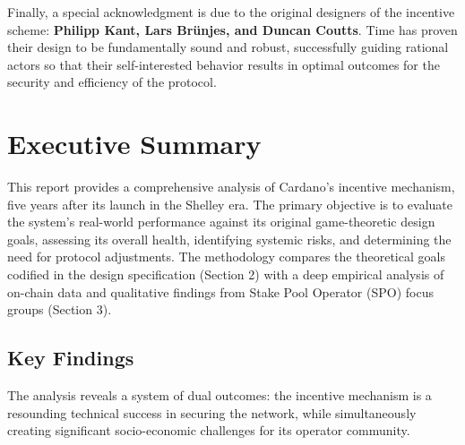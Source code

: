 \documentclass[11pt, letterpaper]{article}
\begin{document}
Finally, a special acknowledgment is due to the original designers of the incentive scheme: 
\textbf{Philipp Kant, Lars Brünjes, and Duncan Coutts}. Time has proven their design to be fundamentally 
sound and robust, successfully guiding rational actors so that their self-interested behavior results in 
optimal outcomes for the security and efficiency of the protocol.

\newpage


\section*{Executive Summary}

This report provides a comprehensive analysis of Cardano's incentive mechanism, five years after its 
launch in the Shelley era. The primary objective is to evaluate the system's real-world performance 
against its original game-theoretic design goals, assessing its overall health, identifying systemic 
risks, and determining the need for protocol adjustments. The methodology compares the theoretical goals 
codified in the design specification (Section 2) with a deep empirical analysis of on-chain data and 
qualitative findings from Stake Pool Operator (SPO) focus groups (Section 3).

\subsection*{Key Findings}

The analysis reveals a system of dual outcomes: the incentive mechanism is a resounding technical 
success in securing the network, while simultaneously creating significant socio-economic challenges 
for its operator community.
\end{document}
